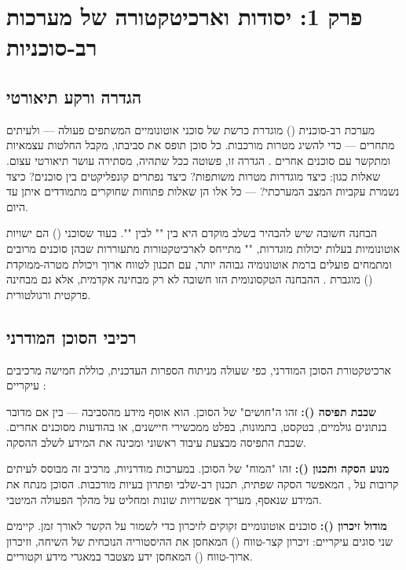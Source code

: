 \documentclass[12pt,a4paper]{article}
\begin{document}
\section{פרק 1: יסודות וארכיטקטורה של מערכות רב-סוכניות}

\subsection{הגדרה ורקע תיאורטי}

מערכת רב-סוכנית () מוגדרת כרשת של סוכני  אוטונומיים המשתפים פעולה --- ולעיתים מתחרים --- כדי להשיג מטרות מורכבות. כל סוכן תופס את סביבתו, מקבל החלטות עצמאיות ומתקשר עם סוכנים אחרים \cite{Cognizant2025}. הגדרה זו, פשוטה ככל שתהיה, מסתירה עושר תיאורטי עצום. שאלות כגון: כיצד מוגדרות מטרות משותפות? כיצד נפתרים קונפליקטים בין סוכנים? כיצד נשמרת עקביות המצב המערכתי? --- כל אלו הן שאלות פתוחות שחוקרים מתמודדים איתן עד היום.

הבחנה חשובה שיש להבהיר בשלב מוקדם היא בין "" לבין "". בעוד שסוכני  () הם ישויות אוטונומיות בעלות יכולות מוגדרות, "" מתייחס לארכיטקטורות מתעוררות שבהן סוכנים מרובים ומתמחים פועלים ברמת אוטונומיה גבוהה יותר, עם תכנון לטווח ארוך ויכולת מטרה-ממוקדת () מוגברת \cite{ScienceDirect_Agentic2025}. ההבחנה הטקסונומית הזו חשובה לא רק מבחינה אקדמית, אלא גם מבחינה פרקטית ורגולטורית.

\subsection{רכיבי הסוכן המודרני}

ארכיטקטורת הסוכן המודרני, כפי שעולה מניתוח הספרות העדכנית, כוללת חמישה מרכיבים עיקריים \cite{arXiv2503}:

\textbf{שכבת תפיסה ():} זהו ה"חושים" של הסוכן. הוא אוסף מידע מהסביבה --- בין אם מדובר בנתונים גולמיים, בטקסט, בתמונות, בפלט ממכשירי חיישנים, או בהודעות מסוכנים אחרים. שכבת התפיסה מבצעת עיבוד ראשוני ומכינה את המידע לשלב ההסקה.

\textbf{מנוע הסקה ותכנון ():} זהו "המוח" של הסוכן. במערכות מודרניות, מרכיב זה מבוסס לעיתים קרובות על , המאפשר הסקה שפתית, תכנון רב-שלבי ופתרון בעיות מורכבות. הסוכן מנתח את המידע שנאסף, מעריך אפשרויות שונות ומחליט על מהלך הפעולה המיטבי.

\textbf{מודול זיכרון ():} סוכנים אוטונומיים זקוקים לזיכרון כדי לשמור על הקשר לאורך זמן. קיימים שני סוגים עיקריים: זיכרון קצר-טווח () המאחסן את ההיסטוריה הנוכחית של השיחה, וזיכרון ארוך-טווח () המאחסן ידע מצטבר במאגרי מידע וקטוריים.
\end{document}
